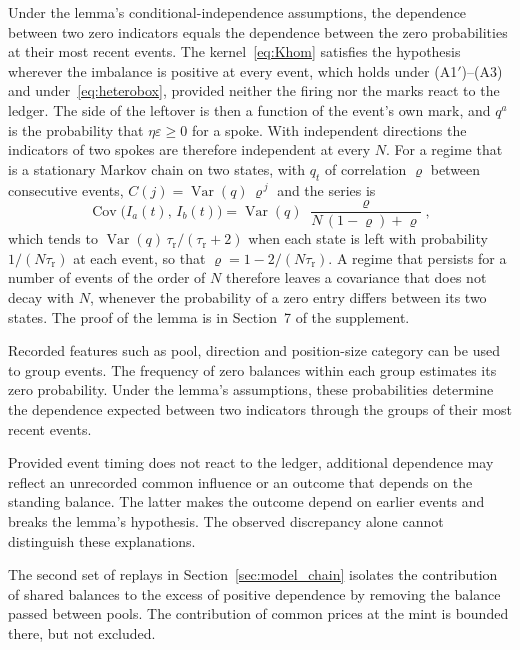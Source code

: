 \documentclass[11pt,a4paper]{article}
\theoremstyle{siphon}
\begin{document}
\noindent Under the lemma's conditional-independence assumptions, the dependence between two zero indicators equals the dependence between the zero probabilities at their most recent events. The kernel~\eqref{eq:Khom} satisfies the hypothesis wherever the imbalance is positive at every event, which holds under (A1$'$)--(A3) and under~\eqref{eq:heterobox}, provided neither the firing nor the marks react to the ledger. The side of the leftover is then a function of the event's own mark, and $q^a$ is the probability that $\eta \varepsilon \geq 0$ for a spoke.
With independent directions the indicators of two spokes are therefore independent at every $N$. For a regime that is a stationary Markov chain on two states, with $q_t$ of correlation $\varrho$ between consecutive events, $C(j) = \operatorname{Var}(q)\,\varrho^{\,j}$ and the series is
\begin{equation}\label{eq:indicatorregime}
\operatorname{Cov}\bigl(I_a(t),\,I_b(t)\bigr)  =  \operatorname{Var}(q)\;\frac{\varrho}{N\,(1 - \varrho) + \varrho} ,
\end{equation}
which tends to $\operatorname{Var}(q)\,\tau_{\mathrm{r}}/(\tau_{\mathrm{r}} + 2)$ when each state is left with probability $1/(N\tau_{\mathrm{r}})$ at each event, so that $\varrho = 1 - 2/(N\tau_{\mathrm{r}})$. A regime that persists for a number of events of the order of $N$ therefore leaves a covariance that does not decay with $N$, whenever the probability of a zero entry differs between its two states. The proof of the lemma is in Section~7 of the supplement.

Recorded features such as pool, direction and position-size category can be used to group events. The frequency of zero balances within each group estimates its zero probability. Under the lemma's assumptions, these probabilities determine the dependence expected between two indicators through the groups of their most recent events.

Provided event timing does not react to the ledger, additional dependence may reflect an unrecorded common influence or an outcome that depends on the standing balance. The latter makes the outcome depend on earlier events and breaks the lemma's hypothesis. The observed discrepancy alone cannot distinguish these explanations.

The second set of replays in Section~\ref{sec:model_chain} isolates the contribution of shared balances to the excess of positive dependence by removing the balance passed between pools. The contribution of common prices at the mint is bounded there, but not excluded.
\end{document}
